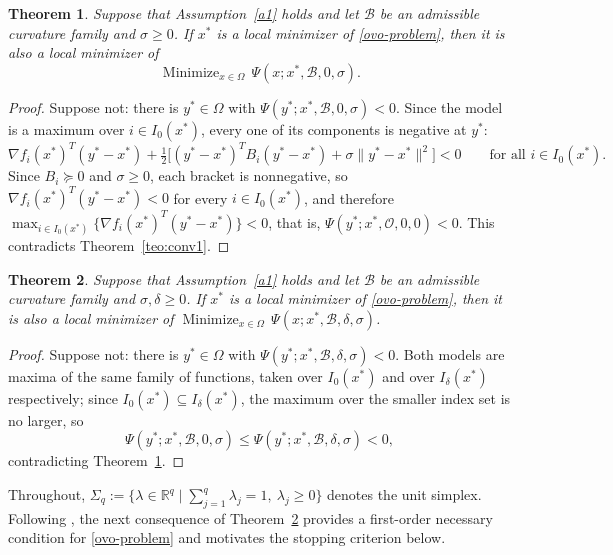 \documentclass[11pt]{article}
\newcommand{\minimize}{\mathop{\text{Minimize}}}
\newtheorem{theorem}{Theorem}[section]
\begin{document}
\begin{theorem} \label{teo:conv2}
Suppose that Assumption~\ref{a1} holds and let $\mathcal{B}$ be an admissible
curvature family and $\sigma \geq 0$. If $x^*$ is a local minimizer of
\eqref{ovo-problem}, then it is also a local minimizer of
\[
\minimize_{x \in \Omega}\, \Psi(x; x^*, \mathcal{B}, 0, \sigma).
\]
\end{theorem}

\begin{proof}
Suppose not: there is $y^* \in \Omega$ with
$\Psi(y^*; x^*, \mathcal{B}, 0, \sigma) < 0$. Since the model is a maximum over
$i \in I_0(x^*)$, every one of its components is negative at $y^*$:
\[
\nabla f_i(x^*)^T(y^* - x^*)
+ \tfrac{1}{2} \big[ (y^* - x^*)^T B_i (y^* - x^*) + \sigma \|y^* - x^*\|^2 \big]
< 0 \qquad \text{for all } i \in I_0(x^*).
\]
Since $B_i \succeq 0$ and $\sigma \geq 0$, each bracket is nonnegative, so
$\nabla f_i(x^*)^T(y^* - x^*) < 0$ for every $i \in I_0(x^*)$, and therefore
$\max_{i \in I_0(x^*)} \{ \nabla f_i(x^*)^T(y^* - x^*) \} < 0$, that is,
$\Psi(y^*; x^*, \mathcal{O}, 0, 0) < 0$. This contradicts
Theorem~\ref{teo:conv1}.
\end{proof}

\begin{theorem} \label{teo:conv3}
Suppose that Assumption~\ref{a1} holds and let $\mathcal{B}$ be an admissible
curvature family and $\sigma, \delta \geq 0$. If $x^*$ is a local minimizer of
\eqref{ovo-problem}, then it is also a local minimizer of
$\minimize_{x \in \Omega}\, \Psi(x; x^*, \mathcal{B}, \delta, \sigma)$.
\end{theorem}

\begin{proof}
Suppose not: there is $y^* \in \Omega$ with
$\Psi(y^*; x^*, \mathcal{B}, \delta, \sigma) < 0$. Both models are maxima of the
same family of functions, taken over $I_0(x^*)$ and over $I_\delta(x^*)$
respectively; since $I_0(x^*) \subseteq I_\delta(x^*)$, the maximum over the
smaller index set is no larger, so
\[
\Psi(y^*; x^*, \mathcal{B}, 0, \sigma)
\leq \Psi(y^*; x^*, \mathcal{B}, \delta, \sigma) < 0,
\]
contradicting Theorem~\ref{teo:conv2}.
\end{proof}

Throughout, $\Sigma_q := \{ \lambda \in \mathbb{R}^q \mid
\sum_{j=1}^q \lambda_j = 1,\ \lambda_j \geq 0 \}$ denotes the unit simplex.
Following \cite{alvarezovo}, the next consequence of Theorem~\ref{teo:conv3}
provides a first-order necessary condition for \eqref{ovo-problem} and
motivates the stopping criterion below.
\end{document}
